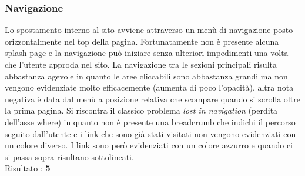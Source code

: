 \subsubsection{Navigazione}
Lo spostamento interno al sito avviene attraverso un menù di navigazione posto
orizzontalmente nel top della pagina. Fortunatamente non è presente alcuna
splash page e la navigazione può iniziare senza ulteriori impedimenti 
una volta che l'utente approda nel sito. 
La navigazione tra le sezioni principali
risulta abbastanza agevole in quanto le aree cliccabili sono abbastanza grandi
ma non vengono evidenziate molto efficacemente (aumenta di poco l'opacità),
altra nota negativa è data dal 
menù a posizione relativa che scompare quando si scrolla oltre la prima pagina.
Si riscontra il classico problema \textit{lost in navigation} (perdita dell'asse
where) in quanto non è
presente una breadcrumb che indichi il percorso seguito dall'utente e i link che 
sono già stati visitati non vengono evidenziati con un colore diverso. I link 
sono però evidenziati con un colore azzurro e quando ci si passa sopra risultano
sottolineati. \\
Risultato : \textbf{5}
